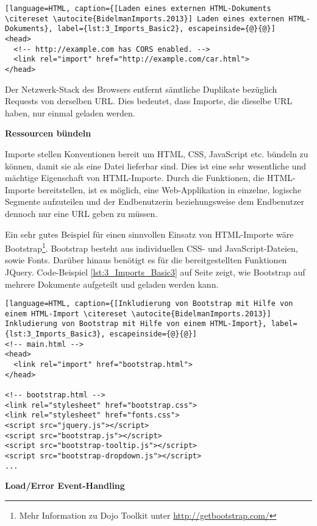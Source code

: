 \begin{lstlisting}[language=HTML, caption={[Laden eines externen HTML-Dokuments \citereset \autocite{BidelmanImports.2013}] Laden eines externen HTML-Dokuments}, label={lst:3_Imports_Basic2}, escapeinside={@}{@}]
<head>
  <!-- http://example.com has CORS enabled. -->
  <link rel="import" href="http://example.com/car.html">
</head>
\end{lstlisting}

Der Netzwerk-Stack des Browsers entfernt sämtliche Duplikate bezüglich Requests von derselben URL. Dies bedeutet, dass Importe, die dieselbe URL haben, nur einmal geladen werden.

\textbf{Ressourcen bündeln}

Importe stellen Konventionen bereit um HTML, CSS, JavaScript etc. bündeln zu können, damit sie als eine Datei lieferbar sind. Dies ist eine sehr wesentliche und mächtige Eigenschaft von HTML-Importe. Durch die Funktionen, die HTML-Importe bereitstellen, ist es möglich, eine Web-Applikation in einzelne, logische Segmente aufzuteilen und der Endbenutzerin beziehungsweise dem Endbenutzer dennoch nur eine URL geben zu müssen.

Ein sehr gutes Beispiel für einen sinnvollen Einsatz von HTML-Importe wäre Bootstrap\footnote{Mehr Information zu Dojo Toolkit unter \href{http://getbootstrap.com/}{http://getbootstrap.com/}}. Bootstrap besteht aus individuellen CSS- und JavaScript-Dateien, sowie Fonts. Darüber hinaus benötigt es für die bereitgestellten Funktionen JQuery. Code-Beispiel \ref{lst:3_Imports_Basic3} auf Seite \pageref{lst:3_Imports_Basic3} zeigt, wie Bootstrap auf mehrere Dokumente aufgeteilt und geladen werden kann.

\begin{lstlisting}[language=HTML, caption={[Inkludierung von Bootstrap mit Hilfe von einem HTML-Import \citereset \autocite{BidelmanImports.2013}] Inkludierung von Bootstrap mit Hilfe von einem HTML-Import}, label={lst:3_Imports_Basic3}, escapeinside={@}{@}]
<!-- main.html -->
<head>
  <link rel="import" href="bootstrap.html">
</head>

<!-- bootstrap.html -->
<link rel="stylesheet" href="bootstrap.css">
<link rel="stylesheet" href="fonts.css">
<script src="jquery.js"></script>
<script src="bootstrap.js"></script>
<script src="bootstrap-tooltip.js"></script>
<script src="bootstrap-dropdown.js"></script>
...
\end{lstlisting}

\textbf{Load/Error Event-Handling}

